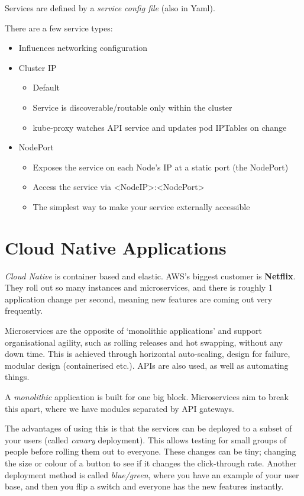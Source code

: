 \documentclass[11pt,a4paper,titlepage,dvipsnames,cmyk]{scrartcl}
\begin{document}
Services are defined by a \textit{service config file} (also in Yaml).

There are a few service types:
\begin{itemize}
    \item Influences networking configuration
    \item Cluster IP
    \begin{itemize}
        \item Default
        \item Service is discoverable/routable only within the cluster
        \item kube-proxy watches API service and updates pod IPTables on change
    \end{itemize}
    \item NodePort
    \begin{itemize}
        \item Exposes the service on each Node's IP at a static port (the NodePort)
        \item Access the service via <NodeIP>:<NodePort>
        \item The simplest way to make your service externally accessible
    \end{itemize}
\end{itemize}
\section{Cloud Native Applications}
\textit{Cloud Native} is container based and elastic. AWS's biggest customer is \textbf{Netflix}. They roll out so many instances and microservices, and there is roughly 1 application change per second, meaning new features are coming out very frequently.

Microservices are the opposite of `monolithic applications' and support organisational agility, such as rolling releases and hot swapping, without any down time. This is achieved through horizontal auto-scaling, design for failure, modular design (containerised etc.). APIs are also used, as well as automating things.

A \textit{monolithic} application is built for one big block. Microservices aim to break this apart, where we have modules separated by API gateways.

The advantages of using this is that the services can be deployed to a subset of your users (called \textit{canary} deployment). This allows testing for small groups of people before rolling them out to everyone. These changes can be tiny; changing the size or colour of a button to see if it changes the click-through rate. Another deployment method is called \textit{blue/green}, where you have an example of your user base, and then you flip a switch and everyone has the new features instantly.
\end{document}
